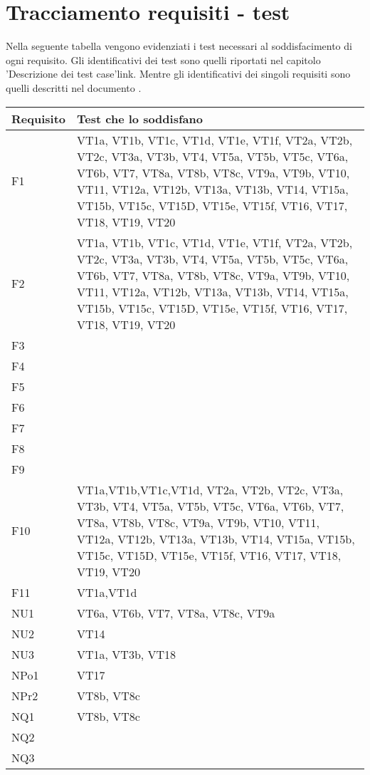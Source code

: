 \section{Tracciamento requisiti - test}
Nella seguente tabella vengono evidenziati i test necessari al soddisfacimento di ogni requisito. Gli identificativi dei test sono quelli riportati nel capitolo 'Descrizione dei test case'{link}. Mentre gli identificativi dei singoli requisiti sono quelli descritti nel documento \AR .
 \begin{center}
\begin{tabular}{|p{3cm}|p{8cm}|} \hline
\textbf{Requisito} & \textbf{Test che lo soddisfano}\\ \hline
F1  & VT1a, VT1b, VT1c, VT1d, VT1e, VT1f, VT2a, VT2b, VT2c, VT3a, VT3b, VT4, VT5a, VT5b, VT5c, VT6a, VT6b, VT7, VT8a, VT8b, VT8c, VT9a, VT9b, VT10, VT11, VT12a, VT12b, VT13a, VT13b, VT14, VT15a, VT15b, VT15c, VT15D, VT15e, VT15f, VT16, VT17, VT18, VT19, VT20\\ \hline
F2  &  VT1a, VT1b, VT1c, VT1d, VT1e, VT1f, VT2a, VT2b, VT2c, VT3a, VT3b, VT4, VT5a, VT5b, VT5c, VT6a, VT6b, VT7, VT8a, VT8b, VT8c, VT9a, VT9b, VT10, VT11, VT12a, VT12b, VT13a, VT13b, VT14, VT15a, VT15b, VT15c, VT15D, VT15e, VT15f, VT16, VT17, VT18, VT19, VT20\\ \hline
F3  &  \\ \hline
F4  &  \\ \hline
F5  &  \\ \hline
F6  &  \\ \hline
F7  &  \\ \hline
F8  &  \\ \hline
F9  &  \\ \hline
F10 & VT1a,VT1b,VT1c,VT1d, VT2a, VT2b, VT2c, VT3a, VT3b, VT4, VT5a, VT5b, VT5c, VT6a, VT6b, VT7, VT8a, VT8b, VT8c, VT9a, VT9b, VT10, VT11, VT12a, VT12b, VT13a, VT13b, VT14, VT15a, VT15b, VT15c, VT15D, VT15e, VT15f, VT16, VT17, VT18, VT19, VT20 \\ \hline
F11 & VT1a,VT1d \\ \hline
NU1 &  VT6a, VT6b, VT7, VT8a, VT8c, VT9a\\ \hline
NU2 &  VT14\\ \hline
NU3 &  VT1a, VT3b, VT18\\ \hline
NPo1 &  VT17\\ \hline
NPr2 &  VT8b, VT8c\\ \hline
NQ1 & VT8b, VT8c  \\ \hline
NQ2 &  \\ \hline
NQ3 &  \\ \hline
\end{tabular} \\
\end{center}



